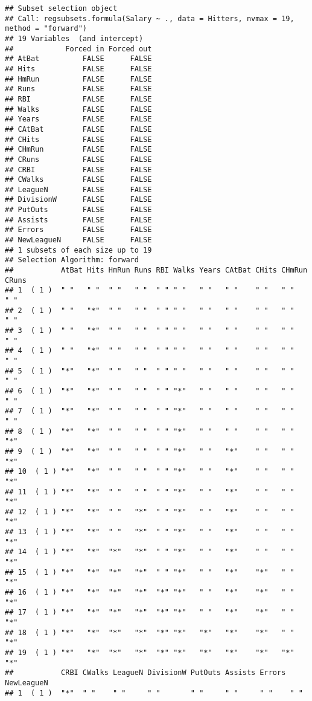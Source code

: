\documentclass[]{article}
\begin{document}
\begin{verbatim}
## Subset selection object
## Call: regsubsets.formula(Salary ~ ., data = Hitters, nvmax = 19, method = "forward")
## 19 Variables  (and intercept)
##            Forced in Forced out
## AtBat          FALSE      FALSE
## Hits           FALSE      FALSE
## HmRun          FALSE      FALSE
## Runs           FALSE      FALSE
## RBI            FALSE      FALSE
## Walks          FALSE      FALSE
## Years          FALSE      FALSE
## CAtBat         FALSE      FALSE
## CHits          FALSE      FALSE
## CHmRun         FALSE      FALSE
## CRuns          FALSE      FALSE
## CRBI           FALSE      FALSE
## CWalks         FALSE      FALSE
## LeagueN        FALSE      FALSE
## DivisionW      FALSE      FALSE
## PutOuts        FALSE      FALSE
## Assists        FALSE      FALSE
## Errors         FALSE      FALSE
## NewLeagueN     FALSE      FALSE
## 1 subsets of each size up to 19
## Selection Algorithm: forward
##           AtBat Hits HmRun Runs RBI Walks Years CAtBat CHits CHmRun CRuns
## 1  ( 1 )  " "   " "  " "   " "  " " " "   " "   " "    " "   " "    " "  
## 2  ( 1 )  " "   "*"  " "   " "  " " " "   " "   " "    " "   " "    " "  
## 3  ( 1 )  " "   "*"  " "   " "  " " " "   " "   " "    " "   " "    " "  
## 4  ( 1 )  " "   "*"  " "   " "  " " " "   " "   " "    " "   " "    " "  
## 5  ( 1 )  "*"   "*"  " "   " "  " " " "   " "   " "    " "   " "    " "  
## 6  ( 1 )  "*"   "*"  " "   " "  " " "*"   " "   " "    " "   " "    " "  
## 7  ( 1 )  "*"   "*"  " "   " "  " " "*"   " "   " "    " "   " "    " "  
## 8  ( 1 )  "*"   "*"  " "   " "  " " "*"   " "   " "    " "   " "    "*"  
## 9  ( 1 )  "*"   "*"  " "   " "  " " "*"   " "   "*"    " "   " "    "*"  
## 10  ( 1 ) "*"   "*"  " "   " "  " " "*"   " "   "*"    " "   " "    "*"  
## 11  ( 1 ) "*"   "*"  " "   " "  " " "*"   " "   "*"    " "   " "    "*"  
## 12  ( 1 ) "*"   "*"  " "   "*"  " " "*"   " "   "*"    " "   " "    "*"  
## 13  ( 1 ) "*"   "*"  " "   "*"  " " "*"   " "   "*"    " "   " "    "*"  
## 14  ( 1 ) "*"   "*"  "*"   "*"  " " "*"   " "   "*"    " "   " "    "*"  
## 15  ( 1 ) "*"   "*"  "*"   "*"  " " "*"   " "   "*"    "*"   " "    "*"  
## 16  ( 1 ) "*"   "*"  "*"   "*"  "*" "*"   " "   "*"    "*"   " "    "*"  
## 17  ( 1 ) "*"   "*"  "*"   "*"  "*" "*"   " "   "*"    "*"   " "    "*"  
## 18  ( 1 ) "*"   "*"  "*"   "*"  "*" "*"   "*"   "*"    "*"   " "    "*"  
## 19  ( 1 ) "*"   "*"  "*"   "*"  "*" "*"   "*"   "*"    "*"   "*"    "*"  
##           CRBI CWalks LeagueN DivisionW PutOuts Assists Errors NewLeagueN
## 1  ( 1 )  "*"  " "    " "     " "       " "     " "     " "    " "       

\end{verbatim}
\end{document}
